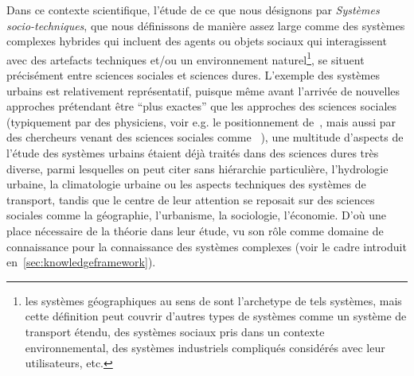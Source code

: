 {Dans ce contexte scientifique, l'étude de ce que nous désignons par \emph{Systèmes socio-techniques}, que nous définissons de manière assez large comme des systèmes complexes hybrides qui incluent des agents ou objets sociaux qui interagissent avec des artefacts techniques et/ou un environnement naturel\footnote{les systèmes géographiques au sens de \cite{dollfus1975some} sont l'archetype de tels systèmes, mais cette définition peut couvrir d'autres types de systèmes comme un système de transport étendu, des systèmes sociaux pris dans un contexte environnemental, des systèmes industriels compliqués considérés avec leur utilisateurs, etc.}, se situent précisément entre sciences sociales et sciences dures. L'exemple des systèmes urbains est relativement représentatif, puisque même avant l'arrivée de nouvelles approches prétendant être ``plus exactes'' que les approches des sciences sociales (typiquement par des physiciens, voir e.g. le positionnement de~\cite{louf2014scaling}, mais aussi par des chercheurs venant des sciences sociales comme ~\cite{batty2013new}), une multitude d'aspects de l'étude des systèmes urbains étaient déjà traités dans des sciences dures très diverse, parmi lesquelles on peut citer sans hiérarchie particulière, l'hydrologie urbaine, la climatologie urbaine ou les aspects techniques des systèmes de transport, tandis que le centre de leur attention se reposait sur des sciences sociales comme la géographie, l'urbanisme, la sociologie, l'économie. D'où une place nécessaire de la théorie dans leur étude, vu son rôle comme domaine de connaissance pour la connaissance des systèmes complexes (voir le cadre introduit en~\ref{sec:knowledgeframework}).
}


